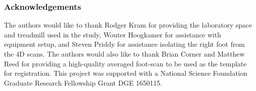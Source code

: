 \documentclass[preprint]{elsarticle}
\begin{document}
% 

\newpage
\subsubsection*{Acknowledgements}
{\small The authors would like to thank Rodger Kram for providing the laboratory space and treadmill used in the study, Wouter Hoogkamer for assistance with equipment setup, and Steven Priddy for assistance isolating the right foot from the 4D scans. The authors would also like to thank Brian Corner and Matthew Reed for providing a high-quality averaged foot-scan to be used as the template for registration. This project was supported with a National Science Foundation Graduate Research Fellowship Grant DGE 1650115.}



\end{document}
